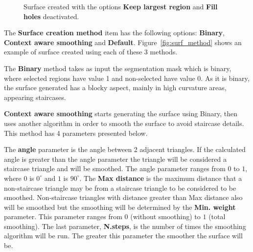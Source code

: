 \begin{figure}
  \centering
  \caption{Surface created with the options \textbf{Keep largest region} and \textbf{Fill holes} deactivated.}
  \label{fig:surface_ex2}
\end{figure}

The \textbf{Surface creation method} item has the following options: \textbf{Binary}, \textbf{Context aware smoothing} and \textbf{Default}. Figure~\ref{fig:surf_method} shows an example of surface created using each of these 3 methods.

The \textbf{Binary} method takes as input the segmentation mask which is binary, where selected regions have value 1 and non-selected have value 0. As it is binary, the surface generated has a blocky aspect, mainly in high curvature areas, appearing staircases.

\textbf{Context aware smoothing} starts generating the surface using Binary, then uses another algorithm in order to smooth the surface to avoid staircase details. This method has 4 parameters presented below.

The \textbf{angle} parameter is the angle between 2 adjacent triangles. If the calculated angle is greater than the angle parameter the triangle will be considered a staircase triangle and will be smoothed. The angle parameter ranges from $0$ to $1$, where $0$ is $0^\circ$ and $1$ is $90^\circ$. The \textbf{Max distance} is the maximum distance that a non-staircase triangle may be from a staircase triangle to be considered to be smoothed. Non-staircase triangles with distance greater than Max distance also will be smoothed but the smoothing will be determined by the \textbf{Min. weight} parameter. This parameter ranges from $0$ (without smoothing) to $1$ (total smoothing). The last parameter, \textbf{N.steps}, is the number of times the smoothing algorithm will be run. The greater this parameter the smoother the surface will be.

